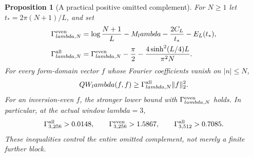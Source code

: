 \documentclass[11pt]{article}
\def\lambda{lambda}%
\newtheorem{proposition}[theorem]{Proposition}
\theoremstyle{remark}
\begin{document}
\begin{proposition}[A practical positive omitted complement]
\label{prop:v115-sharp-tail}
For $N\ge1$ let $t_*=2\pi(N+1)/L$, and set
\begin{align}
 \Gamma_{\lambda,N}^{\rm even}
   &=\log\frac{N+1}{L}-M_\lambda
                -\frac{2C_L}{t_*}-E_L(t_*),\notag\\
 \Gamma_{\lambda,N}^{\rm all}
   &=\Gamma_{\lambda,N}^{\rm even}-\frac\pi2
                   -\frac{4\sinh^2(L/4)L}{\pi^2N}.
 \label{eq:v115-sharp-tail}
\end{align}
For every form-domain vector $f$ whose Fourier coefficients vanish on
$|n|\le N$,
\[
 QW_\lambda(f,f)\ge\Gamma_{\lambda,N}^{\rm all}\|f\|_2^2.
\]
For an inversion-even $f$, the stronger lower bound with
$\Gamma_{\lambda,N}^{\rm even}$ holds. In particular, at the actual
window $\lambda=3$,
\begin{equation}\label{eq:v115-lambda3-tail}
 \Gamma_{3,256}^{\rm all}>0.0148,\qquad
 \Gamma_{3,256}^{\rm even}>1.5867,\qquad
 \Gamma_{3,512}^{\rm all}>0.7085.
\end{equation}
These inequalities control the entire omitted complement, not merely a
finite further block.
\end{proposition}
\end{document}
